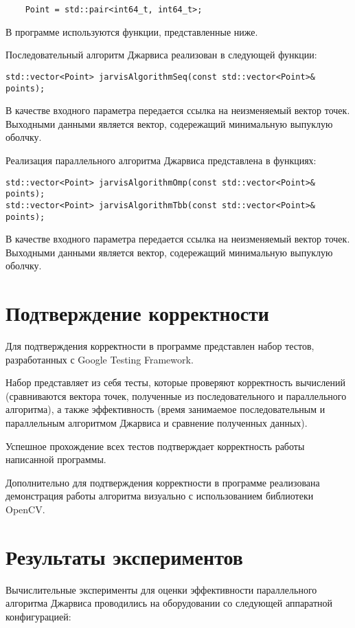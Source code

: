 \documentclass{report}
\begin{document}
\begin{lstlisting}
	Point = std::pair<int64_t, int64_t>;
\end{lstlisting}
В программе используются функции, представленные ниже.
\par Последовательный алгоритм Джарвиса реализован в следующей функции:
\begin{lstlisting}
std::vector<Point> jarvisAlgorithmSeq(const std::vector<Point>& points);
\end{lstlisting}
\par В качестве входного параметра передается ссылка на неизменяемый вектор точек. Выходными данными является вектор, содережащий минимальную выпуклую оболчку.
\par Реализация параллельного алгоритма Джарвиса представлена в функциях:
\begin{lstlisting}
std::vector<Point> jarvisAlgorithmOmp(const std::vector<Point>& points);
std::vector<Point> jarvisAlgorithmTbb(const std::vector<Point>& points);
\end{lstlisting}
\par В качестве входного параметра передается ссылка на неизменяемый вектор точек. Выходными данными является вектор, содережащий минимальную выпуклую оболчку.

\newpage

\section*{Подтверждение корректности}
Для подтверждения корректности в программе представлен набор тестов, разработанных с Google Testing Framework.
\par Набор представляет из себя тесты, которые проверяют корректность вычислений (сравниваются вектора точек, полученные из последовательного и параллельного алгоритма), а также эффективность (время занимаемое последовательным и параллельным алгоритмом Джарвиса и сравнение полученных данных).

\par Успешное прохождение всех тестов подтверждает корректность работы написанной программы.

\par Дополнительно для подтверждения корректности в программе реализована демонстрация работы алгоритма визуально с использованием библиотеки OpenCV.
\newpage

\section*{Результаты экспериментов}
Вычислительные эксперименты для оценки эффективности параллельного алгоритма Джарвиса проводились на оборудовании со следующей аппаратной конфигурацией:
\end{document}
